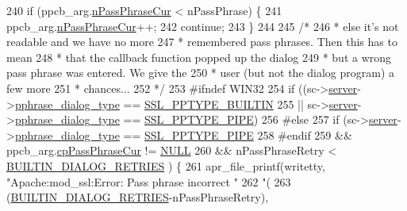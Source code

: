 \begin{DoxyCode}
{{{{240         \textcolor{keywordflow}{if} (ppcb\_arg.\hyperlink{structpphrase__cb__arg__t_aef3e0a2bfde0f62c1bca633c5e388524}{nPassPhraseCur} < nPassPhrase) \{
241             ppcb\_arg.\hyperlink{structpphrase__cb__arg__t_aef3e0a2bfde0f62c1bca633c5e388524}{nPassPhraseCur}++;
242             \textcolor{keywordflow}{continue};
243         \}
244 
245         \textcolor{comment}{/*}
246 \textcolor{comment}{         * else it's not readable and we have no more}
247 \textcolor{comment}{         * remembered pass phrases. Then this has to mean}
248 \textcolor{comment}{         * that the callback function popped up the dialog}
249 \textcolor{comment}{         * but a wrong pass phrase was entered.  We give the}
250 \textcolor{comment}{         * user (but not the dialog program) a few more}
251 \textcolor{comment}{         * chances...}
252 \textcolor{comment}{         */}
253 \textcolor{preprocessor}{#ifndef WIN32}
254         \textcolor{keywordflow}{if} ((sc->\hyperlink{structSSLSrvConfigRec_a7941dbc2f9fa504b3968a4afdc4b96fc}{server}->\hyperlink{structmodssl__ctx__t_a1fe0b0fdd63583304dae0dfd85982771}{pphrase\_dialog\_type} == 
      \hyperlink{group__MOD__SSL__PRIVATE_ggad9be8a03d6bba7c92cf27a00ab9f7971a95c73eaa9cd87a96f4a968b8c1a174bd}{SSL\_PPTYPE\_BUILTIN}
255              || sc->\hyperlink{structSSLSrvConfigRec_a7941dbc2f9fa504b3968a4afdc4b96fc}{server}->\hyperlink{structmodssl__ctx__t_a1fe0b0fdd63583304dae0dfd85982771}{pphrase\_dialog\_type} == 
      \hyperlink{group__MOD__SSL__PRIVATE_ggad9be8a03d6bba7c92cf27a00ab9f7971a33ff980280a4799be36e18829885da9a}{SSL\_PPTYPE\_PIPE})
256 \textcolor{preprocessor}{#else}
257         \textcolor{keywordflow}{if} (sc->\hyperlink{structSSLSrvConfigRec_a7941dbc2f9fa504b3968a4afdc4b96fc}{server}->\hyperlink{structmodssl__ctx__t_a1fe0b0fdd63583304dae0dfd85982771}{pphrase\_dialog\_type} == 
      \hyperlink{group__MOD__SSL__PRIVATE_ggad9be8a03d6bba7c92cf27a00ab9f7971a33ff980280a4799be36e18829885da9a}{SSL\_PPTYPE\_PIPE}
258 #endif
259             && ppcb\_arg.\hyperlink{structpphrase__cb__arg__t_af6aaf85042706fa2215ce1164a2aa7eb}{cpPassPhraseCur} != \hyperlink{pcre_8txt_ad7f989d16aa8ca809a36bc392c07fba1}{NULL}
260             && nPassPhraseRetry < \hyperlink{ssl__engine__pphrase_8c_add3d818ed8e8da505874e77640d3a751}{BUILTIN\_DIALOG\_RETRIES} ) \{
261             apr\_file\_printf(writetty, \textcolor{stringliteral}{"Apache:mod\_ssl:Error: Pass phrase incorrect "}
262                     \textcolor{stringliteral}{"(%
263                     (\hyperlink{ssl__engine__pphrase_8c_add3d818ed8e8da505874e77640d3a751}{BUILTIN\_DIALOG\_RETRIES}-nPassPhraseRetry),
}}}}}
\end{DoxyCode}
